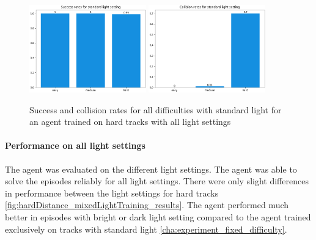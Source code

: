 \begin{figure}
    \centering
    \includegraphics[width=0.45\textwidth]{Bilder/notebook_images/hardDistanceMixedLight_eval_standard_success_rates_barplot.png}
    \includegraphics[width=0.45\textwidth]{Bilder/notebook_images/hardDistanceMixedLight_eval_standard_collision_rates_barplot.png}
    \caption{Success and collision rates for all difficulties with standard light for an agent trained on hard tracks with all light settings}
    \label{fig:hardDistance_mixedLight_generalization}
\end{figure}

\paragraph{Performance on all light settings}
The agent was evaluated on the different light settings. The agent was able to solve the episodes reliably for all light settings. There were only slight differences in performance between the light settings for hard tracks \ref{fig:hardDistance_mixedLightTraining_results}.
The agent performed much better in episodes with bright or dark light setting compared to the agent trained exclusively on tracks with standard light \ref{cha:experiment_fixed_difficulty}.

